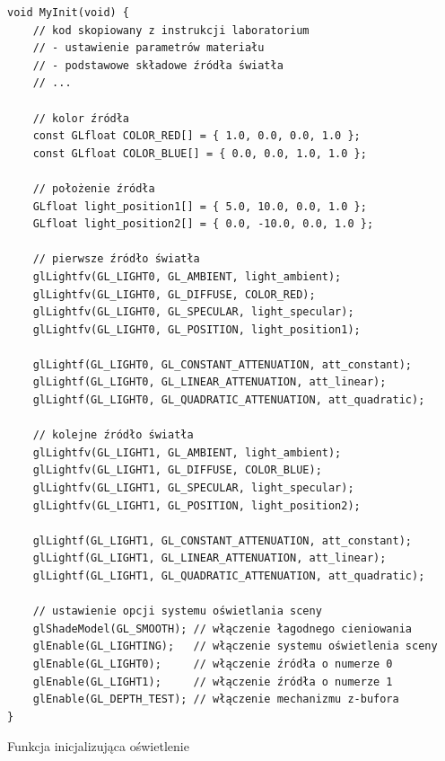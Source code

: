 \documentclass[12pt,a4paper,titlepage]{article}
\newenvironment{longlisting}{}{}
\begin{document}
\begin{longlisting}
\begin{verbatim}
void MyInit(void) {   
    // kod skopiowany z instrukcji laboratorium
    // - ustawienie parametrów materiału
    // - podstawowe składowe źródła światła
    // ...
  
    // kolor źródła
    const GLfloat COLOR_RED[] = { 1.0, 0.0, 0.0, 1.0 };
    const GLfloat COLOR_BLUE[] = { 0.0, 0.0, 1.0, 1.0 };
  
    // położenie źródła
    GLfloat light_position1[] = { 5.0, 10.0, 0.0, 1.0 };
    GLfloat light_position2[] = { 0.0, -10.0, 0.0, 1.0 };
    
    // pierwsze źródło światła
    glLightfv(GL_LIGHT0, GL_AMBIENT, light_ambient);
    glLightfv(GL_LIGHT0, GL_DIFFUSE, COLOR_RED);
    glLightfv(GL_LIGHT0, GL_SPECULAR, light_specular);
    glLightfv(GL_LIGHT0, GL_POSITION, light_position1);
    
    glLightf(GL_LIGHT0, GL_CONSTANT_ATTENUATION, att_constant);
    glLightf(GL_LIGHT0, GL_LINEAR_ATTENUATION, att_linear);
    glLightf(GL_LIGHT0, GL_QUADRATIC_ATTENUATION, att_quadratic);
    
    // kolejne źródło światła
    glLightfv(GL_LIGHT1, GL_AMBIENT, light_ambient);
    glLightfv(GL_LIGHT1, GL_DIFFUSE, COLOR_BLUE);
    glLightfv(GL_LIGHT1, GL_SPECULAR, light_specular);
    glLightfv(GL_LIGHT1, GL_POSITION, light_position2);
    
    glLightf(GL_LIGHT1, GL_CONSTANT_ATTENUATION, att_constant);
    glLightf(GL_LIGHT1, GL_LINEAR_ATTENUATION, att_linear);
    glLightf(GL_LIGHT1, GL_QUADRATIC_ATTENUATION, att_quadratic);

    // ustawienie opcji systemu oświetlania sceny 
    glShadeModel(GL_SMOOTH); // włączenie łagodnego cieniowania
    glEnable(GL_LIGHTING);   // włączenie systemu oświetlenia sceny 
    glEnable(GL_LIGHT0);     // włączenie źródła o numerze 0
    glEnable(GL_LIGHT1);     // włączenie źródła o numerze 1
    glEnable(GL_DEPTH_TEST); // włączenie mechanizmu z-bufora 
}
\end{verbatim}
\end{longlisting}
\begin{listing}
\caption{Funkcja inicjalizująca oświetlenie}
\end{listing}
\end{document}
